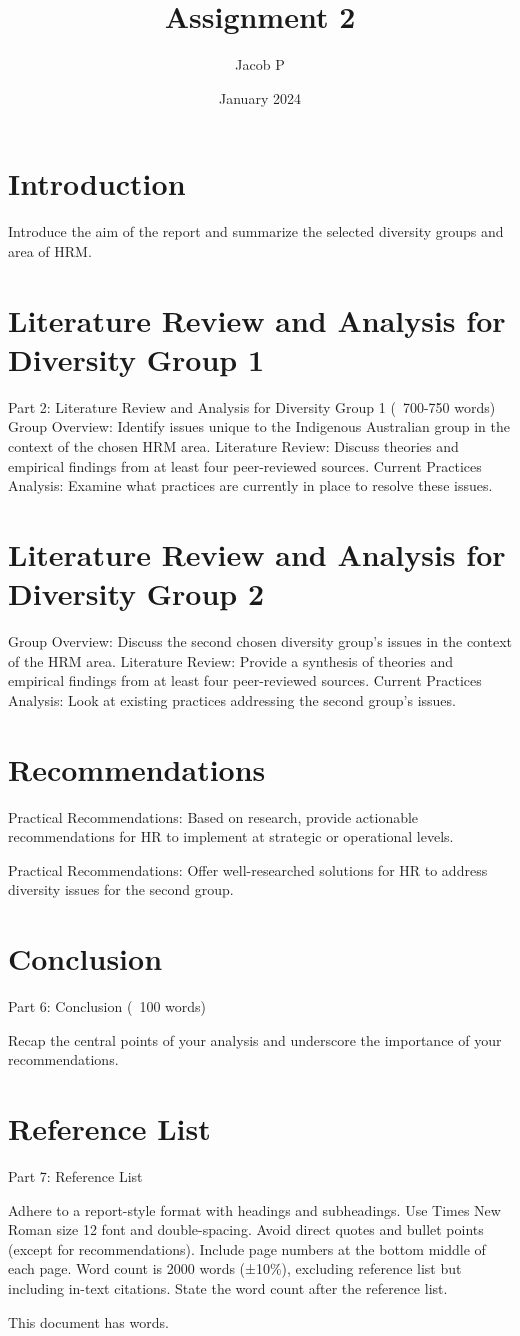 \documentclass{article}
\title{Assignment 2}
\author{Jacob P }
\date{January 2024}
\begin{document}
\maketitle

\section{Introduction}
Introduce the aim of the report and summarize the selected diversity groups and area of HRM. \cite{aquinoJalvesaqZotcite2024}

\section{Literature Review and Analysis for Diversity Group 1}
Part 2: Literature Review and Analysis for Diversity Group 1 (~700-750 words) 
Group Overview: Identify issues unique to the Indigenous Australian group in the context of the chosen HRM area.
Literature Review: Discuss theories and empirical findings from at least four peer-reviewed sources.
Current Practices Analysis: Examine what practices are currently in place to resolve these issues.

\section{Literature Review and Analysis for Diversity Group 2}
Group Overview: Discuss the second chosen diversity group's issues in the context of the HRM area.
Literature Review: Provide a synthesis of theories and empirical findings from at least four peer-reviewed sources.
Current Practices Analysis: Look at existing practices addressing the second group’s issues.

\section{Recommendations}
Practical Recommendations: Based on research, provide actionable recommendations for HR to implement at strategic or operational levels.

Practical Recommendations: Offer well-researched solutions for HR to address diversity issues for the second group.

\section{Conclusion}
Part 6: Conclusion (~100 words)

Recap the central points of your analysis and underscore the importance of your recommendations.
\section{Reference List}
Part 7: Reference List

Adhere to a report-style format with headings and subheadings.
Use Times New Roman size 12 font and double-spacing.
Avoid direct quotes and bullet points (except for recommendations).
Include page numbers at the bottom middle of each page.
Word count is 2000 words (±10\%), excluding reference list but including in-text citations.
State the word count after the reference list.

\printbibliography
This document has \emph{\bashStdout} words.
\end{document}
